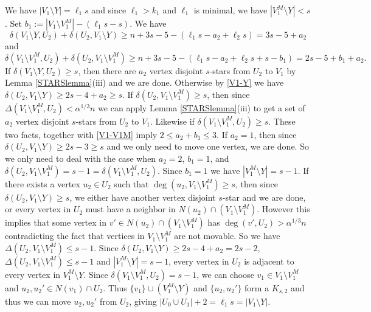 \documentclass[oneside,12pt]{memoir}
\begin{document}
We have $|V_1\setminus Y|=\ell_1s$ and since $\ell_1>k_1$ and $\ell_1$ is minimal, we have $|V_1^M\setminus Y|<s$.  Set $b_1:=|V_1\setminus V_1^M|-(\ell_1s-s)$.  We have 
\begin{equation}\label{V1-Y}
\delta(V_1\setminus Y, U_2)+\delta(U_2, V_1\setminus Y)\geq n+3s-5-(\ell_1s-a_2+\ell_2s)=3s-5+a_2
\end{equation}
and 
\begin{equation}\label{V1-V1M}
\delta(V_1\setminus V_1^M, U_2)+\delta(U_2, V_1\setminus V_1^M)\geq n+3s-5-(\ell_1s-a_2+\ell_2s+s-b_1)=2s-5+b_1+a_2.  
\end{equation}
If $\delta(V_1\setminus Y, U_2)\geq s$, then there are $a_2$ vertex disjoint $s$-stars from $U_2$ to $V_1$ by Lemma \ref{STARSlemma}(iii) and we are done.  Otherwise by \eqref{V1-Y} we have $\delta(U_2, V_1\setminus Y)\geq 2s-4+a_2\geq s$.  If $\delta(U_2, V_1\setminus V_1^M)\geq s$, then since $\Delta(V_1\setminus V_1^M, U_2)<\alpha^{1/3}n$ we can apply Lemma \ref{STARSlemma}(iii) to get a set of $a_2$ vertex disjoint $s$-stars from $U_2$ to $V_1$.  Likewise if $\delta(V_1\setminus V_1^M, U_2)\geq s$.  These two facts, together with \eqref{V1-V1M} imply $2\leq a_2+b_1\leq 3$.  If $a_2=1$, then since $\delta(U_2, V_1\setminus Y)\geq 2s-3\geq s$ and we only need to move one vertex, we are done.  So we only need to deal with the case when $a_2=2$, $b_1=1$, and $\delta(U_2, V_1\setminus V_1^M)=s-1=\delta(V_1\setminus V_1^M, U_2)$. Since $b_1=1$ we have $|V_1^M\setminus Y|=s-1$. If there exists a vertex $u_2\in U_2$ such that $\deg(u_2, V_1\setminus V_1^M)\geq s$, then since $\delta(U_2, V_1\setminus Y)\geq s$, we either have another vertex disjoint $s$-star and we are done, or every vertex in $U_2$ must have a neighbor in $N(u_2)\cap (V_1\setminus V_1^M)$.  However this implies that some vertex in $v'\in N(u_2)\cap (V_1\setminus V_1^M)$ has $\deg(v', U_2)>\alpha^{1/3}n$ contradicting the fact that vertices in $V_1\setminus V_1^M$ are not movable.  So we have $\Delta(U_2, V_1\setminus V_1^M)\leq s-1$.  Since $\delta(U_2, V_1\setminus Y)\geq 2s-4+a_2=2s-2$, $\Delta(U_2, V_1\setminus V_1^M)\leq s-1$ and $|V_1^M\setminus Y|=s-1$, every vertex in $U_2$ is adjacent to every vertex in $V_1^M\setminus Y$.  Since $\delta(V_1\setminus V_1^M, U_2)=s-1$, we can choose $v_1\in V_1\setminus V_1^M$ and $u_2, u_2'\in N(v_1)\cap U_2$.  Thus $\{v_1\}\cup (V_1^M\setminus Y)$ and $\{u_2, u_2'\}$ form a $K_{s,2}$ and thus we can move $u_2,u_2'$ from $U_2$, giving $|U_0\cup U_1|+2=\ell_1s=|V_1\setminus Y|$.
\end{document}
